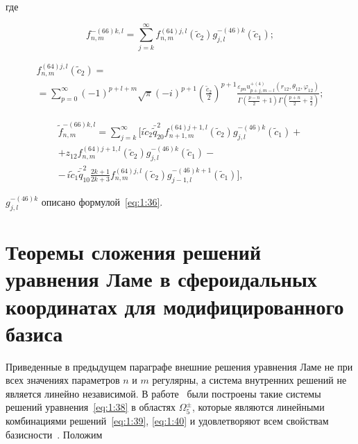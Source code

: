 \begin{theorem}
\noindent где

\begin{equation}\label{eq:1:86}
f_{n,m}^{ - (66)k,l} = \sum\limits_{j = k}^\infty  {f_{n,m}^{(64)j,l}({{\tilde c}_2})g_{j,l}^{ - (46)k}} ({\tilde c_1});
\end{equation}

\begin{multline}\label{eq:1:87}
f_{n,m}^{(64)j,l}({\tilde c_2}) = \\
= \sum\limits_{p = 0}^\infty  {{{( - 1)}^{p + l + m}}} \sqrt \pi  {( - i)^{p + 1}}{\left( {\frac{{{{\tilde c}_2}}}{2}} \right)^{p + 1}}\frac{{{\varepsilon _{pn}}u_{p + j,m - l}^{ + (4)}\left( {{r_{12}},{\theta _{12}},{\varphi _{12}}} \right)}}{{\Gamma \left( {\frac{{p - n}}{2} + 1} \right)\Gamma \left( {\frac{{p + n}}{2} + \frac{3}{2}} \right)}};
\end{multline}

\begin{multline}\label{eq:1:88}
\tilde f_{n,m}^{ - (66)k,l} = \sum\limits_{j = k}^\infty\bigg[i{{\tilde c}_2}\bar{\tilde q}_{20}^2f_{n + 1,m}^{(64)j + 1,l}({{\tilde c}_2})g_{j,l}^{ - (46)k}({{\tilde c}_1}) + \\
+ {z_{12}}f_{n,m}^{(64)j + 1,l}({{\tilde c}_2})g_{j,l}^{ - (46)k}({{\tilde c}_1}) - \\
- {\frac{{}}{{}}i{{\tilde c}_1}\bar{\tilde q}_{10}^2\frac{{2k + 1}}{{2k + 3}}f_{n,m}^{(64)j,l}({{\tilde c}_2})g_{j - 1,l}^{ - (46)k + 1}({{\tilde c}_1})} \bigg],
\end{multline}

\noindent $g_{j,l}^{ - (46)k}$ описано формулой~\eqref{eq:1:36}.
\end{theorem}

\section[Теоремы сложения решений уравнения Ламе в сфероидальных координатах для модифицированного базиса]{Теоремы сложения решений уравнения Ламе в сфероидальных координатах для модифицированного базиса}

Приведенные в предыдущем параграфе внешние решения уравнения Ламе не при всех значениях параметров $n$ и $m$ регулярны, а система внутренних решений не является линейно независимой. В работе~\cite{Nikolaev1993} были построены такие системы решений уравнения~\eqref{eq:1:38} в областях $\Omega_5^{\pm}$, которые являются линейными комбинациями решений~\eqref{eq:1:39}, \eqref{eq:1:40} и удовлетворяют всем свойствам базисности~\cite{Nikolaev1998}. Положим

